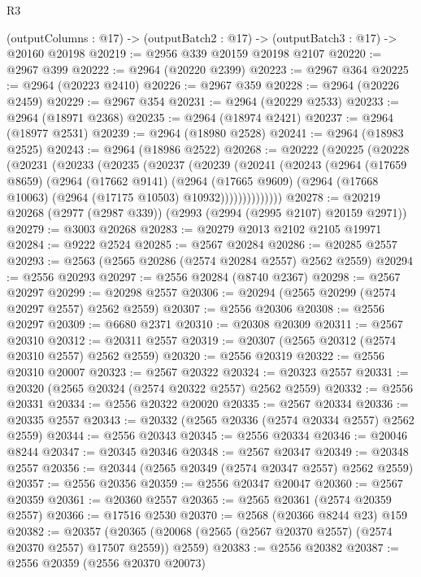 \begin{lexlean}{R3}
\begin{coremodule}
  (outputColumns : @17) -> (outputBatch2 : @17) -> (outputBatch3 : @17) -> @20160 @20198
@20219 := @2956 @339 @20159 @20198 @2107
@20220 := @2967 @399
@20222 := @2964 (@20220 @2399)
@20223 := @2967 @364
@20225 := @2964 (@20223 @2410)
@20226 := @2967 @359
@20228 := @2964 (@20226 @2459)
@20229 := @2967 @354
@20231 := @2964 (@20229 @2533)
@20233 := @2964 (@18971 @2368)
@20235 := @2964 (@18974 @2421)
@20237 := @2964 (@18977 @2531)
@20239 := @2964 (@18980 @2528)
@20241 := @2964 (@18983 @2525)
@20243 := @2964 (@18986 @2522)
@20268 := @20222
    (@20225
      (@20228
        (@20231
          (@20233
            (@20235
              (@20237
                (@20239
                  (@20241
                    (@20243
                      (@2964
                        (@17659 @8659)
                        (@2964
                          (@17662 @9141)
                          (@2964
                            (@17665 @9609)
                            (@2964 (@17668 @10063) (@2964 (@17175 @10503) @10932))))))))))))))
@20278 := @20219 @20268 (@2977 (@2987 @339)) (@2993 (@2994 (@2995 @2107) @20159 @2971))
@20279 := @3003 @20268
@20283 := @20279 @2013 @2102 @2105 @19971
@20284 := @9222 @2524
@20285 := @2567 @20284
@20286 := @20285 @2557
@20293 := @2563 (@2565 @20286 (@2574 @20284 @2557) @2562 @2559)
@20294 := @2556 @20293
@20297 := @2556 @20284 (@8740 @2367)
@20298 := @2567 @20297
@20299 := @20298 @2557
@20306 := @20294 (@2565 @20299 (@2574 @20297 @2557) @2562 @2559)
@20307 := @2556 @20306
@20308 := @2556 @20297
@20309 := @6680 @2371
@20310 := @20308 @20309
@20311 := @2567 @20310
@20312 := @20311 @2557
@20319 := @20307 (@2565 @20312 (@2574 @20310 @2557) @2562 @2559)
@20320 := @2556 @20319
@20322 := @2556 @20310 @20007
@20323 := @2567 @20322
@20324 := @20323 @2557
@20331 := @20320 (@2565 @20324 (@2574 @20322 @2557) @2562 @2559)
@20332 := @2556 @20331
@20334 := @2556 @20322 @20020
@20335 := @2567 @20334
@20336 := @20335 @2557
@20343 := @20332 (@2565 @20336 (@2574 @20334 @2557) @2562 @2559)
@20344 := @2556 @20343
@20345 := @2556 @20334
@20346 := @20046 @8244
@20347 := @20345 @20346
@20348 := @2567 @20347
@20349 := @20348 @2557
@20356 := @20344 (@2565 @20349 (@2574 @20347 @2557) @2562 @2559)
@20357 := @2556 @20356
@20359 := @2556 @20347 @20047
@20360 := @2567 @20359
@20361 := @20360 @2557
@20365 := @2565 @20361 (@2574 @20359 @2557)
@20366 := @17516 @2530
@20370 := @2568 (@20366 @8244 @23) @159
@20382 := @20357
    (@20365 (@20068 (@2565 (@2567 @20370 @2557) (@2574 @20370 @2557) @17507 @2559)) @2559)
@20383 := @2556 @20382
@20387 := @2556 @20359 (@2556 @20370 @20073)

\end{coremodule}
\end{lexlean}
